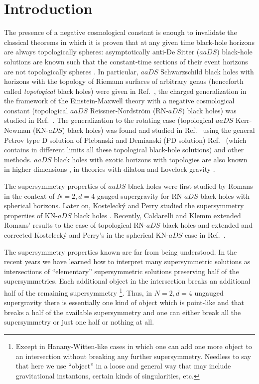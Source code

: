 \documentclass[12pt,a4paper]{article}
\begin{document}
\newpage

\pagestyle{plain}


\section*{Introduction}

The presence of a negative cosmological constant is enough to
invalidate the classical theorems \cite{art:Haw7,art:FSW} in which it
is proven that at any given time black-hole horizons are always
topologically spheres: asymptotically anti-De Sitter ($aaDS$)
black-hole solutions are known such that the constant-time sections of
their event horizons are not topologically spheres
\cite{art:ABHP,art:Man1,art:Man2,art:SM,art:Le1,art:Le2,art:LeZa,art:CaZh,
  art:HL,art:Bir}.  In particular, $aaDS$ Schwarzschild black holes
with horizons with the topology of Riemann surfaces of arbitrary genus
(henceforth called {\it topological} black holes) were given in
Ref.~\cite{art:Va}, the charged generalization in the framework of the
Einstein-Maxwell theory with a negative cosmological constant
(topological $aaDS$ Reissner-Nordstr\"{o}m (RN-$aDS$) black holes) was
studied in Ref.~\cite{art:BLP}. The generalization to the rotating
case (topological $aaDS$ Kerr-Newman (KN-$aDS$) black holes) was found
and studied in Ref.~\cite{art:KMV} using the general Petrov type D
solution of Plebanski and Demianski (PD solution) Ref.~\cite{art:PD}
(which contains in different limits all these topological black-hole
solutions) and other methods. $aaDS$ black holes with exotic horizons
with topologies are also known in higher dimensions \cite{art:Bir}, in
theories with dilaton \cite{kn:Cai1} and Lovelock gravity
\cite{kn:Cai2}.

The supersymmetry properties of $aaDS$ black holes were first studied
by Romans in the context of $N=2,d=4$ gauged supergravity
\cite{art:Ro} for RN-$aDS$ black holes with spherical horizons.  Later
on, Kosteleck\'y and Perry studied the supersymmetry properties of
KN-$aDS$ black holes \cite{art:KP}.  Recently, Caldarelli and Klemm
extended Romans' results to the case of topological RN-$aDS$ black
holes and extended and corrected Kosteleck\'y and Perry's in the
spherical KN-$aDS$ case in Ref.~\cite{art:CK}.

The supersymmetry properties known are far from being understood.  In
the recent years we have learned how to interpret many supersymmetric
solutions as intersections of ``elementary'' supersymmetric solutions
preserving half of the supersymmetries. Each additional object in the
intersection breaks an additional half of the remaining supersymmetry
\footnote{Except in Hanany-Witten-like cases in which one can add one
  more object to an intersection without breaking any further
  supersymmetry. Needless to say that here we use ``object'' in a
  loose and general way that may include gravitational instantons,
  certain kinds of singularities, etc.}. Thus, in $N=2,d=4$ ungauged
supergravity there is essentially one kind of object which is
point-like and that breaks a half of the available supersymmetry and
one can either break all the supersymmetry or just one half or nothing
at all.
\end{document}
